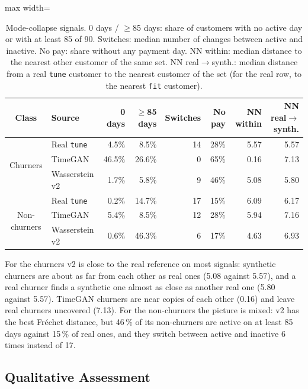 \documentclass{article}
\begin{document}
\begin{table}[H]
\centering
\renewcommand{\arraystretch}{1.3}
\begin{adjustbox}{max width=\textwidth}
\begin{tabular}{|c|l|r|r|r|r|r|r|}
\hline
\textbf{Class} & \textbf{Source} & \textbf{0 days} & \textbf{$\ge$85 days} & \textbf{Switches} & \textbf{No pay} & \textbf{NN within} & \textbf{NN real$\to$synth.} \\ \hline
\multirow{3}{*}{Churners} & Real \texttt{tune} & 4.5\% & 8.5\% & 14 & 28\% & 5.57 & 5.57 \\ \cline{2-8}
 & TimeGAN & 46.5\% & 26.6\% & 0 & 65\% & 0.16 & 7.13 \\ \cline{2-8}
 & Wasserstein v2 & 1.7\% & 5.8\% & 9 & 46\% & 5.08 & 5.80 \\ \hline
\multirow{3}{*}{Non-churners} & Real \texttt{tune} & 0.2\% & 14.7\% & 17 & 15\% & 6.09 & 6.17 \\ \cline{2-8}
 & TimeGAN & 5.4\% & 8.5\% & 12 & 28\% & 5.94 & 7.16 \\ \cline{2-8}
 & Wasserstein v2 & 0.6\% & 46.3\% & 6 & 17\% & 4.63 & 6.93 \\ \hline
\end{tabular}
\end{adjustbox}
\caption{Mode-collapse signals. 0 days / $\ge$85 days: share of customers with no active day or with at least 85 of 90. Switches: median number of changes between active and inactive. No pay: share without any payment day. NN within: median distance to the nearest other customer of the same set. NN real$\to$synth.: median distance from a real \texttt{tune} customer to the nearest customer of the set (for the real row, to the nearest \texttt{fit} customer).}
\label{tab:w5_collapse}
\end{table}

For the churners v2 is close to the real reference on most signals: synthetic churners are about as far from each other as real ones (5.08 against 5.57), and a real churner finds a synthetic one almost as close as another real one (5.80 against 5.57). TimeGAN churners are near copies of each other (0.16) and leave real churners uncovered (7.13). For the non-churners the picture is mixed: v2 has the best Fréchet distance, but 46\,\% of its non-churners are active on at least 85 days against 15\,\% of real ones, and they switch between active and inactive 6 times instead of 17.

\subsection{Qualitative Assessment}
\end{document}

